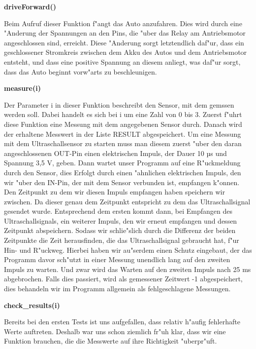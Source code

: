 \documentclass[a4paper,12pt]{article}
\begin{document}
\medskip

\textbf{driveForward()}

Beim Aufruf dieser Funktion f"angt das Auto anzufahren.
Dies wird durch eine "Anderung der Spannungen an den Pins, die "uber das Relay am Antriebsmotor angeschlossen sind, erreicht.
Diese "Anderung sorgt letztendlich daf"ur, dass ein geschlossener Stromkreis zwischen dem Akku des Autos und dem Antriebsmotor entsteht, und dass eine positive Spannung an diesem anliegt, was daf"ur sorgt, dass das Auto beginnt vorw"arts zu beschleunigen.

\medskip

\textbf{measure(i)}

Der Parameter i in dieser Funktion beschreibt den Sensor, mit dem gemssen werden soll.
Dabei handelt es sich bei i um eine Zahl von 0 bis 3.
Zuerst f"uhrt diese Funktion eine Messung mit dem angegebenen Sensor durch.
Danach wird der erhaltene Messwert in der Liste RESULT abgespeichert.
Um eine Messung mit dem Ultraschallsensor zu starten muss man diesem zuerst "uber den daran angeschlossenen OUT-Pin einen elektrischen Impuls, der Dauer 10 µs und Spannung 3,5 V, geben.
Dann wartet unser Programm auf eine R"uckmeldung durch den Sensor, dies Erfolgt durch einen "ahnlichen elektrischen Impuls, den wir "uber den IN-Pin, der mit dem Sensor verbunden ist, empfangen k"onnen.
Den Zeitpunkt zu dem wir diesen Impuls empfangen haben speichern wir zwischen.
Da dieser genau dem Zeitpunkt entspricht zu dem das Ultraschallsignal gesendet wurde.
Entsprechend dem ersten kommt dann, bei Empfangen des Ultraschallsignals, ein weiterer Impuls, den wir erneut empfangen und dessen Zeitpunkt abspeichern.
Sodass wir schlie"slich durch die Differenz der beiden Zeitpunkte die Zeit herausfinden, die das Ultraschallsignal gebraucht hat, f"ur Hin- und R"uckweg.
Hierbei haben wir au"serdem einen Schutz eingebaut, der das Programm davor sch"utzt in einer Messung unendlich lang auf den zweiten Impuls zu warten.
Und zwar wird das Warten auf den zweiten Impuls nach 25 ms abgebrochen.
Falls dies passiert, wird als gemessener Zeitwert -1 abgespeichert, dies behandeln wir im Programm allgemein als fehlgeschlagene Messungen.

\medskip

\textbf{check\_results(i)}

Bereits bei den ersten Tests ist uns aufgefallen, dass relativ h"aufig fehlerhafte Werte auftreten.
Deshalb war uns schon ziemlich fr"uh klar, dass wir eine Funktion brauchen, die die Messwerte auf ihre Richtigkeit "uberpr"uft.
\end{document}

